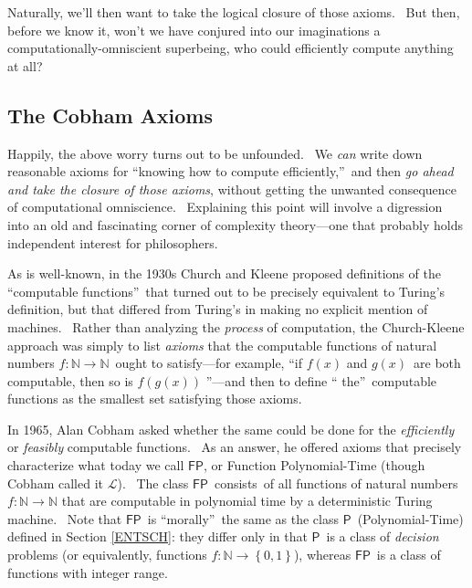 \documentclass[11pt,onecolumn]{article}%
\begin{document}
\noindent Naturally, we'll then want to take the logical closure of those
axioms. \ But then, before we know it, won't we have conjured into our
imaginations a computationally-omniscient superbeing, who could efficiently
compute anything at all?

\subsection{The Cobham Axioms\label{COBHAM}}

Happily, the above worry turns out to be unfounded. \ We \textit{can} write
down reasonable axioms for \textquotedblleft knowing how to compute
efficiently,\textquotedblright\ and then \textit{go ahead and take the closure
of those axioms}, without getting the unwanted consequence of computational
omniscience. \ Explaining this point will involve a digression into an old and
fascinating corner of complexity theory---one that probably holds independent
interest for philosophers.

As is well-known, in the 1930s Church and Kleene proposed definitions of the
\textquotedblleft computable functions\textquotedblright\ that turned out to
be precisely equivalent to Turing's definition, but that differed from
Turing's in making no explicit mention of machines. \ Rather than analyzing
the \textit{process} of computation, the Church-Kleene approach was simply to
list \textit{axioms} that the computable functions of natural numbers
$f:\mathbb{N}\rightarrow\mathbb{N}$\ ought to satisfy---for example,
\textquotedblleft if $f\left(  x\right)  $ and $g\left(  x\right)  $\ are both
computable, then so is $f\left(  g\left(  x\right)  \right)  $%
\textquotedblright---and then to define \textquotedblleft
the\textquotedblright\ computable functions as the smallest set satisfying
those axioms.

In 1965, Alan Cobham \cite{cobham} asked whether the same could be done for
the \textit{efficiently} or \textit{feasibly} computable functions. \ As an
answer, he offered axioms that precisely characterize what today we call
$\mathsf{FP}$, or Function Polynomial-Time (though Cobham called it
$\mathcal{L}$). \ The class $\mathsf{FP}$\ consists\ of all functions of
natural numbers $f:\mathbb{N}\rightarrow\mathbb{N}$ that are computable in
polynomial time by a deterministic Turing machine. \ Note that $\mathsf{FP}%
$\ is \textquotedblleft morally\textquotedblright\ the same as the class
$\mathsf{P}$\ (Polynomial-Time) defined in Section \ref{ENTSCH}: they differ
only in that $\mathsf{P}$\ is a class of \textit{decision} problems (or
equivalently, functions $f:\mathbb{N}\rightarrow\left\{  0,1\right\}  $),
whereas $\mathsf{FP}$\ is a class of functions with integer range.
\end{document}
